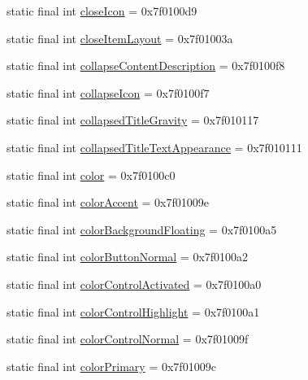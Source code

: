 \begin{CompactItemize}
\item 
static final int \hyperlink{classandroid_1_1support_1_1mediacompat_1_1_r_1_1attr_21972b2264579e655463cc4e496289e4}{closeIcon} = 0x7f0100d9
\item 
static final int \hyperlink{classandroid_1_1support_1_1mediacompat_1_1_r_1_1attr_cc8249671bb67dabb41aa2a0287013fd}{closeItemLayout} = 0x7f01003a
\item 
static final int \hyperlink{classandroid_1_1support_1_1mediacompat_1_1_r_1_1attr_6932b79f10df70f9a4a657051e859dbc}{collapseContentDescription} = 0x7f0100f8
\item 
static final int \hyperlink{classandroid_1_1support_1_1mediacompat_1_1_r_1_1attr_11a6d972b5c87f70ff70d7a33ded2321}{collapseIcon} = 0x7f0100f7
\item 
static final int \hyperlink{classandroid_1_1support_1_1mediacompat_1_1_r_1_1attr_4b24edb03aa3eaf00c03d2ebc33a7c81}{collapsedTitleGravity} = 0x7f010117
\item 
static final int \hyperlink{classandroid_1_1support_1_1mediacompat_1_1_r_1_1attr_4ae5727c50a6328901743cde50f82120}{collapsedTitleTextAppearance} = 0x7f010111
\item 
static final int \hyperlink{classandroid_1_1support_1_1mediacompat_1_1_r_1_1attr_edf42dce0d16b57e1bfc7b63739b36f6}{color} = 0x7f0100c0
\item 
static final int \hyperlink{classandroid_1_1support_1_1mediacompat_1_1_r_1_1attr_957a32157f9c4159576781c43420c140}{colorAccent} = 0x7f01009e
\item 
static final int \hyperlink{classandroid_1_1support_1_1mediacompat_1_1_r_1_1attr_364f647f9c67ba392b936f9dcc5d49c6}{colorBackgroundFloating} = 0x7f0100a5
\item 
static final int \hyperlink{classandroid_1_1support_1_1mediacompat_1_1_r_1_1attr_110e1f2238d8bd2e95a3f1083ed86bad}{colorButtonNormal} = 0x7f0100a2
\item 
static final int \hyperlink{classandroid_1_1support_1_1mediacompat_1_1_r_1_1attr_5a483f9685ffc8713bfe712a31a48786}{colorControlActivated} = 0x7f0100a0
\item 
static final int \hyperlink{classandroid_1_1support_1_1mediacompat_1_1_r_1_1attr_c33494a792895e76182a5b2dd08bd3f4}{colorControlHighlight} = 0x7f0100a1
\item 
static final int \hyperlink{classandroid_1_1support_1_1mediacompat_1_1_r_1_1attr_66ee2a0f2b08d6257def2d5d777e1d97}{colorControlNormal} = 0x7f01009f
\item 
static final int \hyperlink{classandroid_1_1support_1_1mediacompat_1_1_r_1_1attr_c5b65403dfab483c842d288f9f117e9c}{colorPrimary} = 0x7f01009c

\end{CompactItemize}
